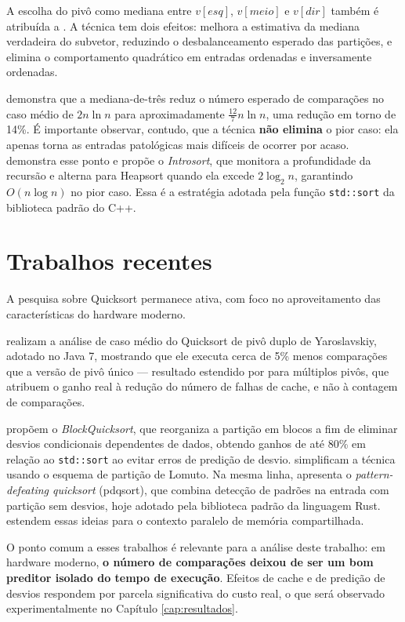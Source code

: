 A escolha do pivô como mediana entre $v[esq]$, $v[meio]$ e $v[dir]$ também é atribuída
a . A técnica tem dois efeitos: melhora a estimativa da
mediana verdadeira do subvetor, reduzindo o desbalanceamento esperado das partições,
e elimina o comportamento quadrático em entradas ordenadas e inversamente ordenadas.

 demonstra que a mediana-de-três reduz o número esperado de
comparações no caso médio de $2n\ln n$ para aproximadamente $\frac{12}{7} n \ln n$, uma
redução em torno de 14\%. É importante observar, contudo, que a técnica \textbf{não
elimina} o pior caso: ela apenas torna as entradas patológicas mais difíceis de
ocorrer por acaso.  demonstra esse ponto e propõe o
\textit{Introsort}, que monitora a profundidade da recursão e alterna para Heapsort
quando ela excede $2\log_2 n$, garantindo $O(n \log n)$ no pior caso. Essa é a
estratégia adotada pela função \texttt{std::sort} da biblioteca padrão do C++.

\section{Trabalhos recentes}

A pesquisa sobre Quicksort permanece ativa, com foco no aproveitamento das
características do hardware moderno.

 realizam a análise de caso médio do Quicksort de pivô duplo de
Yaroslavskiy, adotado no Java 7, mostrando que ele executa cerca de 5\% menos
comparações que a versão de pivô único --- resultado estendido por
 para múltiplos pivôs, que atribuem o ganho real à redução
do número de falhas de cache, e não à contagem de comparações.

 propõem o \textit{BlockQuicksort}, que reorganiza a
partição em blocos a fim de eliminar desvios condicionais dependentes de dados,
obtendo ganhos de até 80\% em relação ao \texttt{std::sort} ao evitar erros de
predição de desvio.  simplificam a técnica usando o esquema
de partição de Lomuto. Na mesma linha,  apresenta o
\textit{pattern-defeating quicksort} (pdqsort), que combina detecção de padrões na
entrada com partição sem desvios, hoje adotado pela biblioteca padrão da linguagem
Rust.  estendem essas ideias para o contexto paralelo de
memória compartilhada.

O ponto comum a esses trabalhos é relevante para a análise deste trabalho: em
hardware moderno, \textbf{o número de comparações deixou de ser um bom preditor
isolado do tempo de execução}. Efeitos de cache e de predição de desvios respondem
por parcela significativa do custo real, o que será observado experimentalmente no
Capítulo \ref{cap:resultados}.
